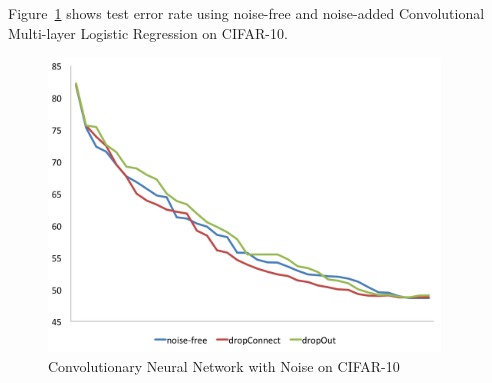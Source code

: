Figure~\ref{convo10} shows test error rate using noise-free and noise-added
Convolutional Multi-layer Logistic Regression on CIFAR-10.
\begin{figure}[!htbp]
\centering
\includegraphics[width=295pt]{f-figs/convo10.png}
\caption{Convolutionary Neural Network with Noise on CIFAR-10}
\label{convo10}
\end{figure}
